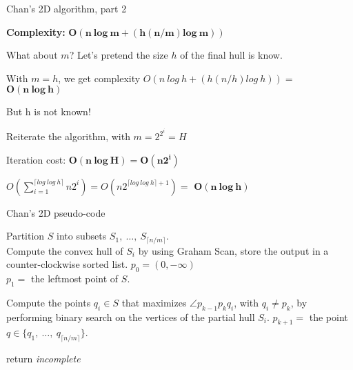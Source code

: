 \documentclass[14pt]{beamer}
\begin{document}
\begin{frame}{Chan's 2D algorithm, part 2}
	\begin{center}
		\vspace{-5mm}
		\begin{fullpageitemize}
			\item<1-> \textbf{Complexity:} \textcolor{colorgreen}{$\bm{O(n\ log\ m + (h(n/m)log\ m))}$}
			\item<2-> What about $m$? Let's pretend the size $h$ of the final hull is know.
			\item<3-> With $m = h$, we get complexity $O(n\ log\ h + (h(n/h)log\ h)) =$ \textcolor{colorgreen}{$\bm{O(n\ log\ h)}$}
			\item<4-> But h is not known! 
			
			\fontsize{12}{14}\notosansfont
			\begin{sublist}
				\item<5-> Reiterate the algorithm, with $m = 2^{2^{i}} = H$
				\item<6-> Iteration cost: \textcolor{colorgreen}{$\bm{O(n\ log\ H) = O(n2^i)}$}
				\item<7-> $O\left(\sum_{i = 1}^{\lceil log\ log\ h\rceil}{n2^i}\right) = O(n2^{\lceil log\ log\ h\rceil + 1}) =$ \textcolor{colorgreen}{$\bm{O(n\ log\ h)}$}
			\end{sublist}
			
			
		\end{fullpageitemize}
	\end{center}
\end{frame}

\begin{frame}{Chan's 2D pseudo-code}
	\fontsize{8}{10}\notosansfont
	\begin{algorithm}[H]
		\DontPrintSemicolon
		\SetAlgoVlined
		Partition $S$ into subsets $S_1,\ \ldots,\ S_{\lceil n/m \rceil}$.\\
		{
			Compute the convex hull of $S_i$ by using Graham Scan, store the output in a counter-clockwise sorted list.
		}  
		$p_0 = (0, -\infty)$\\
		$p_1 =$ the leftmost point of $S$.
		
		{
			{
				Compute the points $q_i \in S$ that maximizes $\angle p_{k-1}p_kq_i$, with $q_i \ne p_k$, by performing binary search on the vertices of the partial hull $S_i$.
			}
			$p_{k+1} = $ the point $q \in \{q_1,\ \ldots,\ q_{\lceil n/m \rceil}\}$.\\
		}
		
		return \textit{incomplete}
		\caption{ChanHullStep, a step of Chan's algorithm}
	\end{algorithm}
\end{frame}
\end{document}
